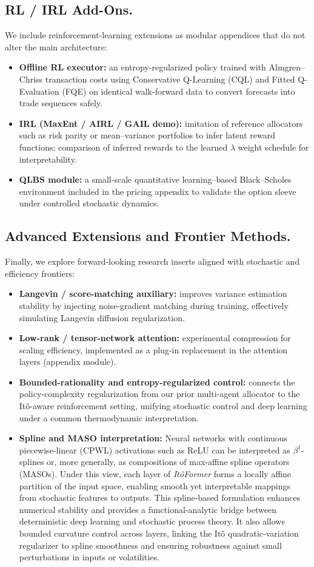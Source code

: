 \documentclass[10pt,twocolumn]{article}
\begin{document}
\subsection{RL / IRL Add-Ons.}
We include reinforcement-learning extensions as modular appendices that do not alter the main architecture:
\begin{itemize}
  \item \textbf{Offline RL executor:} an entropy-regularized policy trained with Almgren–Chriss transaction costs using Conservative Q-Learning (CQL) and Fitted Q-Evaluation (FQE) on identical walk-forward data to convert forecasts into trade sequences safely.
  \item \textbf{IRL (MaxEnt / AIRL / GAIL demo):} imitation of reference allocators such as risk parity or mean–variance portfolios to infer latent reward functions; comparison of inferred rewards to the learned $\lambda$ weight schedule for interpretability.
  \item \textbf{QLBS module:} a small-scale quantitative learning–based Black–Scholes environment included in the pricing appendix to validate the option sleeve under controlled stochastic dynamics.
\end{itemize}

\subsection{Advanced Extensions and Frontier Methods.}
Finally, we explore forward-looking research inserts aligned with stochastic and efficiency frontiers:
\begin{itemize}
  \item \textbf{Langevin / score-matching auxiliary:} improves variance estimation stability by injecting noise-gradient matching during training, effectively simulating Langevin diffusion regularization.
  \item \textbf{Low-rank / tensor-network attention:} experimental compression for scaling efficiency, implemented as a plug-in replacement in the attention layers (appendix module).
  \item \textbf{Bounded-rationality and entropy-regularized control:} connects the policy-complexity regularization from our prior multi-agent allocator to the It\^o-aware reinforcement setting, unifying stochastic control and deep learning under a common thermodynamic interpretation.
  \item \textbf{Spline and MASO interpretation:} Neural networks with continuous piecewise-linear (CPWL) activations such as ReLU can be interpreted as $\beta^1$-splines or, more generally, as compositions of max-affine spline operators (MASOs). Under this view, each layer of \emph{It\^oFormer} forms a locally affine partition of the input space, enabling smooth yet interpretable mappings from stochastic features to outputs. This spline-based formulation enhances numerical stability and provides a functional-analytic bridge between deterministic deep learning and stochastic process theory. It also allows bounded curvature control across layers, linking the It\^o quadratic-variation regularizer to spline smoothness and ensuring robustness against small perturbations in inputs or volatilities.
\end{itemize}
\end{document}
